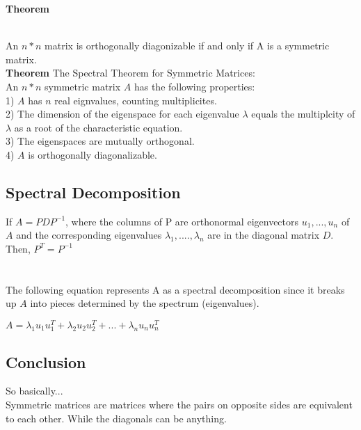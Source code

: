 \documentclass{article}
\begin{document}
    \textbf{Theorem}
   
    

    \\
    An $n*n$ matrix is orthogonally diagonizable if and only if A is a symmetric matrix.\\

    \textbf{Theorem}
    The Spectral Theorem for Symmetric Matrices: \\
    An $n*n$ symmetric matrix $A$ has the following properties:\\
    1) $A$ has $n$ real eignvalues, counting multiplicites.\\
    2) The dimension of the eigenspace for each eigenvalue $\lambda$ equals the multiplcity of $\lambda$ as a root of the characteristic equation.\\
    3) The eigenspaces are mutually orthogonal.\\
    4) $A$ is orthogonally diagonalizable. 

    \subsection*{Spectral Decomposition}
    If $A = PDP^{-1}$, where the columns of P are orthonormal eigenvectors $u_1,...,u_n$ of $A$ and the 
    corresponding eigenvalues $\lambda_1,....,\lambda_n$ are in the diagonal matrix  $D$.\\
    Then, $P^T = P^{-1}$
    \\
    \\
    \\
    The following equation represents A as a spectral decomposition since it breaks up $A$ into pieces
    determined by the spectrum (eigenvalues). 
    \begin{center}
        $A = \lambda_1 u_1 u_1^T+\lambda_2u_2u_2^T+...+\lambda_nu_nu_n^T$
    \end{center}
    
    \subsection*{Conclusion}
    So basically...\\
    Symmetric matrices are matrices where the pairs on opposite sides are equivalent to each other.
    While the diagonals can be anything. 
    

    
\end{document}
